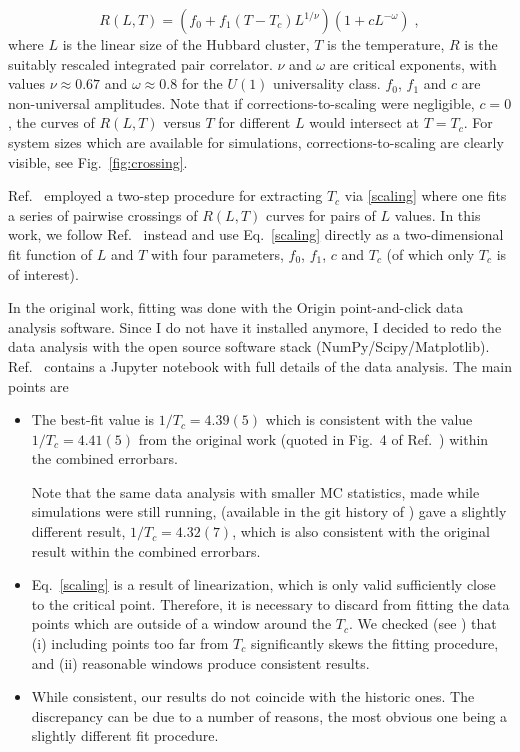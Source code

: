 \begin{equation}
R(L, T) = \left(f_0 + f_1 (T-T_c) L^{1/\nu} \right) \left(1 + c L^{-\omega} \right) \;,
\label{scaling}
\end{equation}
%
where $L$ is the linear size of the Hubbard cluster, $T$ is the temperature, 
$R$ is the suitably rescaled integrated pair correlator. $\nu$ and $\omega$
are critical exponents, with values $\nu \approx 0.67$ and
$\omega \approx 0.8$ for the $U(1)$ universality class. $f_0$, $f_1$ and $c$
are non-universal amplitudes. Note that if corrections-to-scaling were negligible,
$c = 0$, the curves of $R(L, T)$ versus $T$ for different $L$ would intersect at 
$T = T_c$. For system sizes which are available for simulations,
corrections-to-scaling are clearly visible, see Fig.\ \ref{fig:crossing}.

Ref.\ \cite{PRL:2006} employed a two-step procedure for extracting $T_c$ via
\eqref{scaling} where one fits a series of pairwise crossings of $R(L, T)$ curves
for pairs of $L$ values. In this work, we follow Ref.\ \cite{Goulko:2010} instead
and use Eq.\ \eqref{scaling} directly as a two-dimensional fit function
of $L$ and $T$ with four parameters, $f_0$, $f_1$, $c$ and $T_c$ (of which only
$T_c$ is of interest).


In the original work, fitting was done with the Origin point-and-click
data analysis software. Since I do not have it installed anymore, I decided
to redo the data analysis with the open source software stack
(NumPy/Scipy/Matplotlib). Ref.\ \cite{GH:2020} contains a Jupyter notebook
with full details of the data analysis. The main points are
\begin{itemize}
\item The best-fit value is $1/T_c = 4.39(5)$ which is consistent with the value
$1/T_c = 4.41(5)$ from the original work (quoted in Fig.\ 4 of Ref.\ \cite{NJP:2006})
within the combined errorbars.

Note that the same data analysis with smaller MC statistics, made while
simulations were still running, (available in the git history of \cite{GH:2020})
gave a slightly different result, $1/T_c = 4.32(7)$, which is also consistent
with the original result within the combined errorbars.


\item Eq.\ \eqref{scaling} is a result of linearization, which is only valid
sufficiently close to the critical point. Therefore, it is necessary to discard from
fitting the data points which are outside of a window around the $T_c$. We checked
(see \cite{GH:2020}) that (i) including points too far from $T_c$ significantly
skews the fitting procedure, and (ii) reasonable windows produce consistent results.

\item While consistent, our results do not coincide with the historic ones. 
The discrepancy can be due to a number of reasons, the most obvious one being
a slightly different fit procedure. 

\end{itemize}

